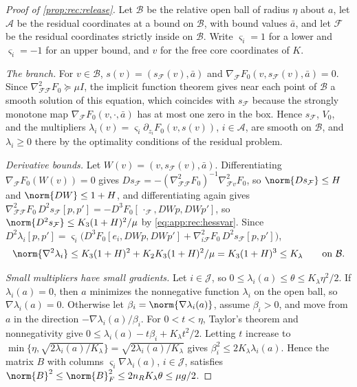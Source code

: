 \begin{proof}[Proof of \cref{prop:rec:release}]
Let $\mathcal B$ be the relative open ball of radius $\eta$ about $a$, let
$\mathcal A$ be the residual coordinates at a bound on $\mathcal B$, with bound
values $\bar a$, and let $\mathcal F$ be the residual coordinates strictly
inside on $\mathcal B$. Write $\varsigma_i=1$ for a lower and $\varsigma_i=-1$
for an upper bound, and $v$ for the free core coordinates of $K$.

\emph{The branch.} For $v\in\mathcal B$, $s(v)=(s_{\mathcal F}(v),\bar a)$ and
$\nabla_{\mathcal F}F_0(v,s_{\mathcal F}(v),\bar a)=0$. Since
$\nabla^2_{\mathcal F\mathcal F}F_0\succeq\mu I$, the implicit function theorem
gives near each point of $\mathcal B$ a smooth solution of this equation, which
coincides with $s_{\mathcal F}$ because the strongly monotone map
$\nabla_{\mathcal F}F_0(v,\cdot,\bar a)$ has at most one zero in the box. Hence
$s_{\mathcal F}$, $V_0$, and the multipliers
$\lambda_i(v)=\varsigma_i\partial_{z_i}F_0(v,s(v))$, $i\in\mathcal A$, are smooth
on $\mathcal B$, and $\lambda_i\ge0$ there by the optimality conditions of the
residual problem.

\emph{Derivative bounds.} Let $W(v)=(v,s_{\mathcal F}(v),\bar a)$. Differentiating
$\nabla_{\mathcal F}F_0(W(v))=0$ gives
$Ds_{\mathcal F}=-(\nabla^2_{\mathcal F\mathcal F}F_0)^{-1}\nabla^2_{\mathcal Fv}F_0$,
so $\norm{Ds_{\mathcal F}}\le H$ and $\norm{DW}\le1+H$, and differentiating again
gives $\nabla^2_{\mathcal F\mathcal F}F_0\,D^2s_{\mathcal F}[p,p']
=-D^3F_0[\,\cdot_{\mathcal F},DWp,DWp']$, so
$\norm{D^2s_{\mathcal F}}\le K_3(1+H)^2/\mu$ by \eqref{eq:app:rec:hessvar}.
Since
$D^2\lambda_i[p,p']=\varsigma_i\bigl(D^3F_0[e_i,DWp,DWp']+
\nabla^2_{i\mathcal F}F_0\,D^2s_{\mathcal F}[p,p']\bigr)$,
\[
 \norm{\nabla^2\lambda_i}\le K_3(1+H)^2+K_2K_3(1+H)^2/\mu=K_3(1+H)^3\le K_\lambda
 \qquad\text{on }\mathcal B .
\]

\emph{Small multipliers have small gradients.} Let $i\in\mathcal J$, so
$0\le\lambda_i(a)\le\theta\le K_\lambda\eta^2/2$. If $\lambda_i(a)=0$, then $a$
minimizes the nonnegative function $\lambda_i$ on the open ball, so
$\nabla\lambda_i(a)=0$. Otherwise let $\beta_i=\norm{\nabla\lambda_i(a)}$, assume
$\beta_i>0$, and move from $a$ in the direction $-\nabla\lambda_i(a)/\beta_i$.
For $0<t<\eta$, Taylor's theorem and nonnegativity give
$0\le\lambda_i(a)-t\beta_i+K_\lambda t^2/2$. Letting $t$ increase to
$\min\{\eta,\sqrt{2\lambda_i(a)/K_\lambda}\}=\sqrt{2\lambda_i(a)/K_\lambda}$ gives
$\beta_i^2\le2K_\lambda\lambda_i(a)$. Hence the matrix $B$ with columns
$\varsigma_i\nabla\lambda_i(a)$, $i\in\mathcal J$, satisfies
$\norm{B}^2\le\norm{B}_F^2\le2n_RK_\lambda\theta\le\mu g/2$.


\end{proof}
